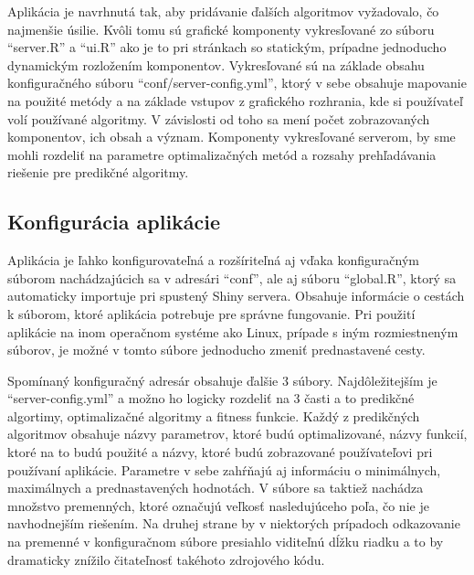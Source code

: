 \documentclass[a4paper,slovak,12pt,appendix]{article}
\begin{document}
Aplikácia je navrhnutá tak, aby pridávanie ďalších algoritmov vyžadovalo, čo
najmenšie úsilie. Kvôli tomu sú grafické komponenty vykresľované zo súboru
``server.R'' a ``ui.R'' ako je to pri stránkach so statickým, prípadne
jednoducho dynamickým rozložením komponentov. Vykresľované sú na základe obsahu
konfiguračného súboru ``conf/server-config.yml'', ktorý v sebe obsahuje
mapovanie na použité metódy a na základe vstupov z grafického rozhrania, kde si
používateľ volí používané algoritmy. V závislosti od toho sa mení počet
zobrazovaných komponentov, ich obsah a význam. Komponenty vykresľované serverom,
by sme mohli rozdeliť na parametre optimalizačných metód a rozsahy
prehľadávania riešenie pre predikčné algoritmy.


\subsection{Konfigurácia aplikácie}
Aplikácia je ľahko konfigurovateľná a rozšíriteľná aj vďaka konfiguračným
súborom nachádzajúcich sa v adresári ``conf'', ale aj súboru ``global.R'',
ktorý sa automaticky importuje pri spustený Shiny servera. Obsahuje informácie
o cestách k súborom, ktoré aplikácia potrebuje pre správne fungovanie. Pri
použití aplikácie na inom operačnom systéme ako Linux, prípade s iným
rozmiestneným súborov, je možné v tomto súbore jednoducho zmeniť prednastavené
cesty.

Spomínaný konfiguračný adresár obsahuje ďalšie 3 súbory. Najdôležitejším je
``server-config.yml'' a možno ho logicky rozdeliť na 3 časti a to predikčné
algortimy, optimalizačné algoritmy a fitness funkcie. Každý z predikčných
algoritmov obsahuje názvy parametrov, ktoré budú optimalizované, názvy funkcií,
ktoré na to budú použité a názvy, ktoré budú zobrazované používateľovi pri
používaní aplikácie. Parametre v sebe zahŕňajú aj informáciu o minimálnych,
maximálnych a prednastavených hodnotách. V súbore sa taktiež nachádza množstvo
premenných, ktoré označujú veľkosť nasledujúceho poľa, čo nie je navhodnejším
riešením. Na druhej strane by v niektorých prípadoch odkazovanie na premenné
v konfiguračnom súbore presiahlo viditeľnú dĺžku riadku a to by dramaticky
znížilo čitateľnosť takéhoto zdrojového kódu.
\end{document}

